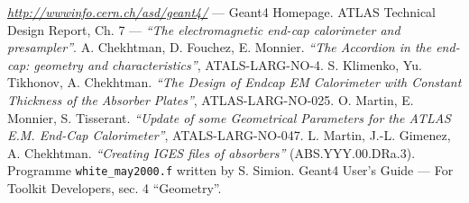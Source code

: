 \begin{thebibliography}{10}
 \underline{\em http://wwwinfo.cern.ch/asd/geant4/} --- Geant4
Homepage.
 ATLAS Technical Design Report, Ch. 7 --- {\em ``The
electromagnetic end-cap calorimeter and presampler''\/}.
 A. Chekhtman, D. Fouchez, E. Monnier. {\em ``The Accordion in the
end-cap: geometry and characteristics''\/}, ATALS-LARG-NO-4.
 S. Klimenko, Yu. Tikhonov, A. Chekhtman. {\em ``The Design of
Endcap EM Calorimeter with Constant Thickness of the Absorber Plates''\/},
ATLAS-LARG-NO-025.
 O. Martin, E. Monnier, S. Tisserant. {\em ``Update of some
Geometrical Parameters for the ATLAS E.M. End-Cap Calorimeter''\/},
ATALS-LARG-NO-047. 
 L. Martin, J.-L. Gimenez, A. Chekhtman. {\em ``Creating
IGES files of absorbers''} (ABS.YYY.00.DRa.3).
 Programme {\tt white\_may2000.f} written by S. Simion.
 Geant4 User's Guide --- For Toolkit Developers, sec. 4
``Geometry''.
\end{thebibliography}
